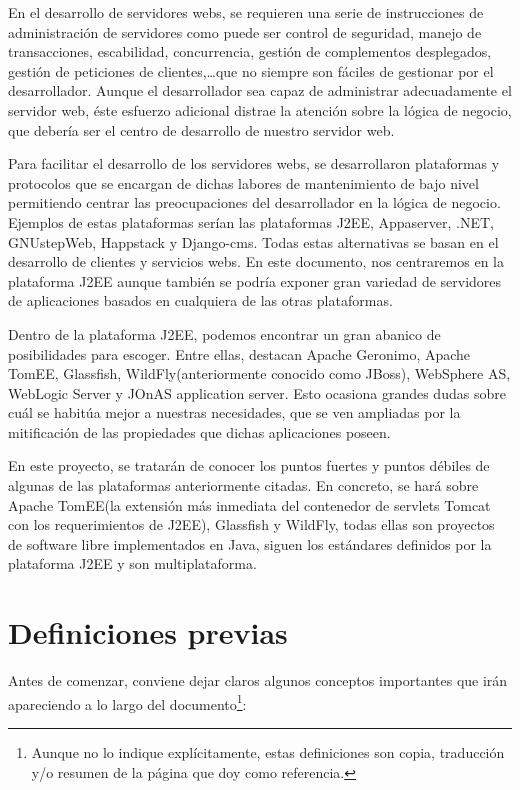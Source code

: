 \documentclass[a4paper, 10pt]{article}
\begin{document}
	En el desarrollo de servidores webs, se requieren una serie de instrucciones de administración de servidores como puede ser control de seguridad, manejo de transacciones, escabilidad, concurrencia, gestión de complementos desplegados, gestión de peticiones de clientes,\dots que no siempre son fáciles de gestionar por el desarrollador. Aunque el desarrollador sea capaz de administrar adecuadamente el servidor web, éste esfuerzo adicional distrae la atención sobre la lógica de negocio, que debería ser el centro de desarrollo de nuestro servidor web.
	
	Para facilitar el desarrollo de los servidores webs, se desarrollaron plataformas y protocolos que se encargan de dichas labores de mantenimiento de bajo nivel permitiendo centrar las preocupaciones del desarrollador en la lógica de negocio. Ejemplos de estas plataformas serían las plataformas J2EE, Appaserver, .NET, GNUstepWeb, Happstack y Django-cms. Todas estas alternativas se basan en el desarrollo de clientes y servicios webs. En este documento, nos centraremos en la plataforma J2EE aunque también se podría exponer gran variedad de servidores de aplicaciones basados en cualquiera de las otras plataformas.
	
	Dentro de la plataforma J2EE, podemos encontrar un gran abanico de posibilidades para escoger. Entre ellas, destacan Apache Geronimo, Apache TomEE, Glassfish, WildFly(anteriormente conocido como JBoss), WebSphere AS, WebLogic Server y JOnAS application server. Esto ocasiona grandes dudas sobre cuál se habitúa mejor a nuestras necesidades, que se ven ampliadas por la mitificación de las propiedades que dichas aplicaciones poseen.
	
	En este proyecto, se tratarán de conocer los puntos fuertes y puntos débiles de algunas de las plataformas anteriormente citadas. En concreto, se hará sobre Apache TomEE(la extensión más inmediata del contenedor de servlets Tomcat con los requerimientos de J2EE), Glassfish y WildFly, todas ellas son proyectos de software libre implementados en Java, siguen los estándares definidos por la plataforma J2EE y son multiplataforma.
	
	
\section{Definiciones previas}
	Antes de comenzar, conviene dejar claros algunos conceptos importantes que irán apareciendo
	a lo largo del documento\footnote{Aunque no lo indique explícitamente, estas definiciones
	son copia, traducción y/o resumen de la página que doy como referencia.}:
\end{document}
